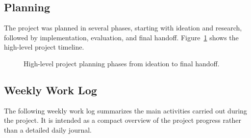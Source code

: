 \subsection{Planning}

The project was planned in several phases, starting with ideation and research, followed by implementation, evaluation, and final handoff. Figure~\ref{fig:project-planning-phases} shows the high-level project timeline.

\begin{figure}[H]
    \centering
    {High-level project planning phases from ideation to final handoff.}
    \label{fig:project-planning-phases}
\end{figure}

\clearpage
\subsection{Weekly Work Log}

The following weekly work log summarizes the main activities carried out during the project. It is intended as a compact overview of the project progress rather than a detailed daily journal.

